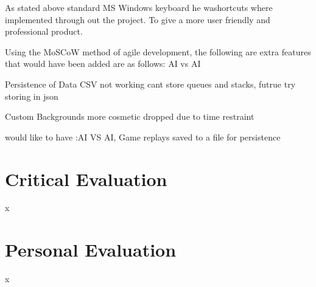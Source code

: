 \documentclass[10pt, a4paper]{article}
\begin{document}
As stated above standard MS Windows keyboard he washortcuts where implemented through out the project. To give a more user friendly and professional product. 

Using the MoSCoW method of agile development, the following are extra features that would have been added are as follows:
AI vs AI

Persistence of Data
CSV not working cant store queues and stacks, futrue try storing in json

Custom Backgrounds 
more cosmetic dropped due to time restraint

	
	would like to have :AI VS AI, Game replays saved to a file for persistence
	
	\section{Critical Evaluation}
	x

	\section{Personal Evaluation}
	x
    
   
   


		
\end{document}
